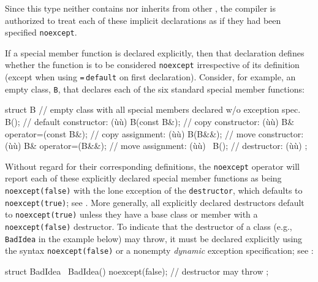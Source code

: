 \noindent Since this type neither contains nor inherits from other
, the compiler is authorized to treat
each of these implicit declarations as if they had been specified
\lstinline!noexcept!.

If a special member function is declared explicitly, then that
declaration defines whether the function is to be considered
\lstinline!noexcept! irrespective of its definition (except when using
\lstinline!=!\,\lstinline!default! on first declaration). Consider, for example, an empty
class, \lstinline!B!, that declares each of the six standard special member
functions:

\begin{emcppslisting}
struct B  // empty class with all special members declared w/o exception spec.
{
    B();                     // default constructor: (ù{}ù)
    B(const B&);             // copy constructor:    (ù{}ù)
    B& operator=(const B&);  // copy assignment:     (ù{}ù)
    B(B&&);                  // move constructor:    (ù{}ù)
    B& operator=(B&&);       // move assignment:     (ù{}ù)
    ~B();                    // destructor:          (ù{}ù)
};
\end{emcppslisting}
    

\noindent Without regard for their corresponding definitions, the
\lstinline!noexcept! operator will report each of these explicitly declared
special member functions as being \lstinline!noexcept(false)! with the lone
exception of the \lstinline!destructor!, which defaults to
\lstinline!noexcept(true)!; see . More generally, all explicitly declared
destructors default to \lstinline!noexcept(true)! unless they have a base
class or member with a \lstinline!noexcept(false)! destructor. To indicate
that the destructor of a class (e.g., \lstinline!BadIdea! in the example
below) may throw, it must be declared explicitly using the syntax
\lstinline!noexcept(false)! or a nonempty \emph{dynamic} exception
specification; see :

\begin{emcppslisting}
struct BadIdea
{
    ~BadIdea() noexcept(false);  // destructor may throw
};
\end{emcppslisting}
    

